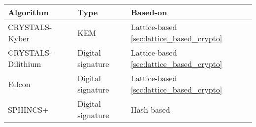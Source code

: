 \begin{tabular}{|l|l|l|}
  \hline
  Algorithm          & Type              & Based-on                                     \\
  \hline
  CRYSTALS-Kyber     & KEM               & Lattice-based \ref{sec:lattice_based_crypto} \\
  CRYSTALS-Dilithium & Digital signature & Lattice-based \ref{sec:lattice_based_crypto} \\
  Falcon             & Digital signature & Lattice-based \ref{sec:lattice_based_crypto} \\
  SPHINCS+           & Digital signature & Hash-based                                   \\
  \hline
\end{tabular}